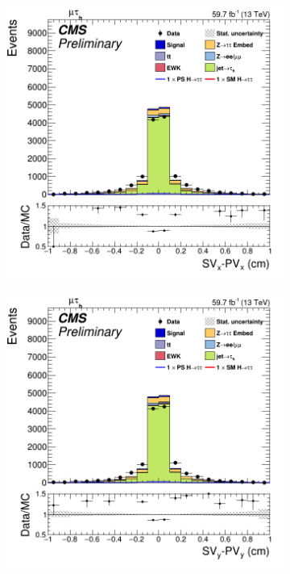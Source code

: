 \begin{figure}
  \begin{subfigure}[b]{0.33\linewidth}
    \centering
    \includegraphics[width=\linewidth]{Chapitre7/Images/TauFlightXfakes.png} 
    \caption{} 
    \vspace{0.5ex}
  \end{subfigure}%
  \begin{subfigure}[b]{0.33\linewidth}
    \centering
    \includegraphics[width=\linewidth]{Chapitre7/Images/TauFlightYfakes.png} 

\end{subfigure}
\end{figure}
